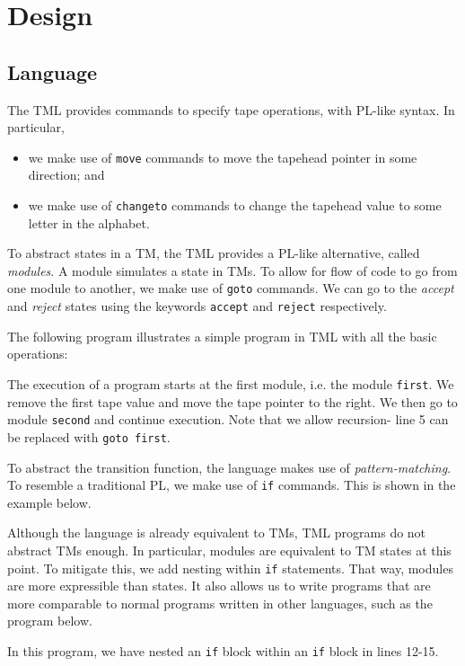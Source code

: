 \chapter{Design}
\section{Language}

The TML provides commands to specify tape operations, with PL-like syntax. In particular, 
\begin{itemize}
    \item we make use of \texttt{move} commands to move the tapehead pointer in some direction; and
    \item we make use of \texttt{changeto} commands to change the tapehead value to some letter in the alphabet.
\end{itemize}
To abstract states in a TM, the TML provides a PL-like alternative, called \emph{modules}. A module simulates a state in TMs. To allow for flow of code to go from one module to another, we make use of \texttt{goto} commands. We can go to the \textit{accept} and \textit{reject} states using the keywords \texttt{accept} and \texttt{reject} respectively.

The following program illustrates a simple program in TML with all the basic operations:

The execution of a program starts at the first module, i.e. the module \texttt{first}. We remove the first tape value and move the tape pointer to the right. We then go to module \texttt{second} and continue execution. Note that we allow recursion- line 5 can be replaced with \texttt{goto first}.

To abstract the transition function, the language makes use of \emph{pattern-matching}. To resemble a traditional PL, we make use of \texttt{if} commands. This is shown in the example below.


Although the language is already equivalent to TMs, TML programs do not abstract TMs enough. In particular, modules are equivalent to TM states at this point. To mitigate this, we add nesting within \texttt{if} statements. That way, modules are more expressible than states. It also allows us to write programs that are more comparable to normal programs written in other languages, such as the program below.

In this program, we have nested an \texttt{if} block within an \texttt{if} block in lines 12-15.

